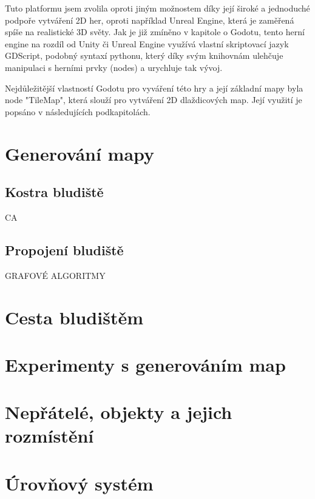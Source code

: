Tuto platformu jsem zvolila oproti jiným možnostem díky její široké a jednoduché podpoře vytváření 2D her, oproti například Unreal Engine, která je zaměřená spíše na realistické 3D světy. Jak je již zmíněno v kapitole o Godotu, tento herní engine na rozdíl od Unity či Unreal Engine využívá vlastní skriptovací jazyk GDScript, podobný syntaxí pythonu, který díky svým knihovnám ulehčuje manipulaci s herními prvky (nodes) a urychluje tak vývoj.

Nejdůležitější vlastností Godotu pro vyváření této hry a její základní mapy byla node "TileMap", která slouží pro vytváření 2D dlaždicových map. Její využití je popsáno v následujících podkapitolách.
    
\section{Generování mapy}
\subsection*{Kostra bludiště}
CA
\subsection*{Propojení bludiště}
GRAFOVÉ ALGORITMY

\section{Cesta bludištěm} %

\section{Experimenty s generováním map} %

\section{Nepřátelé, objekty a jejich rozmístění}

\section{Úrovňový systém}

